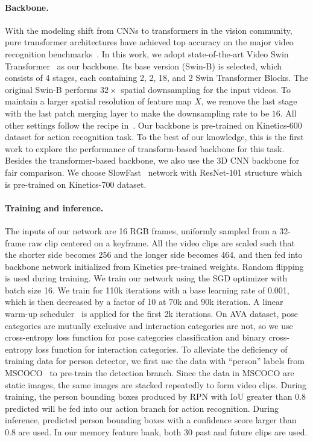 \documentclass[final]{cvpr}
\begin{document}
\paragraph{Backbone.} 
With the modeling shift from CNNs to transformers in the vision community, pure transformer architectures have achieved top accuracy on the major video recognition benchmarks~\cite{DBLP:conf/icml/BertasiusWT21,DBLP:journals/corr/abs-2103-15691,DBLP:journals/corr/abs-2106-13230,DBLP:journals/corr/abs-2104-11227,DBLP:journals/corr/abs-2108-11575,DBLP:journals/corr/abs-2106-11297}. In this work, we adopt state-of-the-art Video Swin Transformer~\cite{DBLP:journals/corr/abs-2106-13230} as our backbone. Its base version (Swin-B) is selected, which consists of 4 stages, each containing 2, 2, 18, and 2 Swin Transformer Blocks. The original Swin-B performs $32\times$ spatial downsampling for the input videos. To maintain a larger spatial resolution of feature map $X$, we remove the last stage with the last patch merging layer to make the downsampling rate to be $16$. All other settings follow the recipe in~\cite{DBLP:journals/corr/abs-2106-13230}. Our backbone is pre-trained on Kinetics-600~\cite{carreira2017quo} dataset for action recognition task. To the best of our knowledge, this is the first work to explore the performance of transform-based backbone for this task. Besides the transformer-based backbone, we also use the 3D CNN backbone for fair comparison. We choose SlowFast~\cite{feichtenhofer2019slowfast} network with ResNet-101 structure which is pre-trained on Kinetics-700 dataset.
\vspace{-3mm}

\paragraph{Training and inference.}
The inputs of our network are 16 RGB frames, uniformly sampled from a 32-frame raw clip centered on a keyframe. All the video clips are scaled such that the shorter side becomes 256 and the longer side becomes 464, and then fed into backbone network initialized from Kinetics pre-trained weights. Random flipping is used during training. We train our network using the SGD optimizer with batch size 16. We train for 110k iterations with a base learning rate of 0.001, which is then decreased by a factor of 10 at 70k and 90k iteration. A linear warm-up scheduler~\cite{goyal2017accurate} is applied for the first 2k iterations. On AVA dataset, pose categories are mutually exclusive and interaction categories are not, so we use cross-entropy loss function for pose categories classification and binary cross-entropy loss function for interaction categories. To alleviate the deficiency of training data for person detector, we first use the data with ``person'' labels from MSCOCO~\cite{lin2014microsoft} to pre-train the detection branch. Since the data in MSCOCO are static images, the same images are stacked repeatedly to form video clips. During training, the person bounding boxes produced by RPN with IoU greater than 0.8 predicted will be fed into our action branch for action recognition. During inference, predicted person bounding boxes with a confidence score larger than 0.8 are used. In our memory feature bank, both 30 past and future clips are used. 
\end{document}
